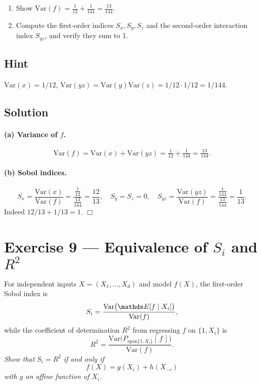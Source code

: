 \documentclass[a4paper]{article}
\begin{document}
\begin{enumerate}%
  \item Show
        \(\text{Var}(f)=\tfrac{1}{12} + \tfrac{1}{144} = \tfrac{13}{144}.\)
  \item Compute the first‐order indices $S_x,S_y,S_z$ and the second‐order
        interaction index $S_{yz}$, and verify they sum to 1.
\end{enumerate}

\subsection*{Hint}
\(\text{Var}(x)=1/12\), \(\text{Var}(yz)=\text{Var}(y)\text{Var}(z)=1/12\cdot1/12=1/144\).

\subsection*{Solution}

\paragraph{(a) Variance of $f$.}
\[
\text{Var}(f) = \text{Var}(x) + \text{Var}(yz)
         = \tfrac{1}{12} + \tfrac{1}{144}
         = \tfrac{13}{144}.
\]

\paragraph{(b) Sobol indices.}
\[
S_x = \frac{\text{Var}(x)}{\text{Var}(f)}
    = \frac{\tfrac1{12}}{\tfrac{13}{144}}
    = \frac{12}{13}, 
\quad
S_y = S_z = 0,
\quad
S_{yz}
= \frac{\text{Var}(yz)}{\text{Var}(f)}
= \frac{\tfrac1{144}}{\tfrac{13}{144}}
= \frac{1}{13}.
\]
Indeed $12/13 + 1/13 = 1$.  \hfill\(\Box\)

\section*{Exercise 9 — Equivalence of $S_i$ and $R^2$}
\label{ex:Sobol_R2_improved}

For independent inputs $X=(X_1,\dots,X_d)$ and model $f(X)$, the first‐order Sobol index is
\[
S_i = \frac{\text{Var}\bigl(\E[f\mid X_i]\bigr)}{\text{Var}(f)},
\]
while the coefficient of determination $R^2$ from regressing $f$ on
$\{1,X_i\}$ is
\[
R^2 = \frac{\text{Var}\bigl(P_{\mathrm{span}\{1,X_i\}}[\,f\,]\bigr)}{\text{Var}(f)}.
\]
\emph{Show that }$S_i = R^2$ \emph{if and only if}
\[
f(X) = g(X_i) + h(X_{-i})
\]
\emph{with $g$ an affine function of $X_i$.}
\end{document}
